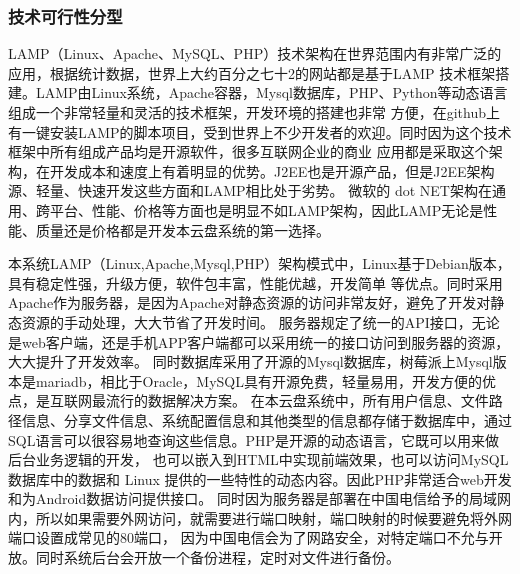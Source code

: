\subsubsection{技术可行性分型}
LAMP（Linux、Apache、MySQL、PHP）技术架构在世界范围内有非常广泛的应用，根据统计数据，世界上大约百分之七十2的网站都是基于LAMP
技术框架搭建。LAMP由Linux系统，Apache容器，Mysql数据库，PHP、Python等动态语言组成一个非常轻量和灵活的技术框架，开发环境的搭建也非常
方便，在github上有一键安装LAMP的脚本项目，受到世界上不少开发者的欢迎\cite{r27}。同时因为这个技术框架中所有组成产品均是开源软件，很多互联网企业的商业
应用都是采取这个架构，在开发成本和速度上有着明显的优势。J2EE也是开源产品，但是J2EE架构源、轻量、快速开发这些方面和LAMP相比处于劣势。
微软的 dot NET架构在通用、跨平台、性能、价格等方面也是明显不如LAMP架构，因此LAMP无论是性能、质量还是价格都是开发本云盘系统的第一选择\cite{r28,r29}。

本系统LAMP（Linux,Apache,Mysql,PHP）架构模式中，Linux基于Debian版本，具有稳定性强，升级方便，软件包丰富，性能优越，开发简单
等优点。同时采用Apache作为服务器，是因为Apache对静态资源的访问非常友好，避免了开发对静态资源的手动处理，大大节省了开发时间。
服务器规定了统一的API接口，无论是web客户端，还是手机APP客户端都可以采用统一的接口访问到服务器的资源，大大提升了开发效率。
同时数据库采用了开源的Mysql数据库，树莓派上Mysql版本是mariadb，相比于Oracle，MySQL具有开源免费，轻量易用，开发方便的优点，是互联网最流行的数据解决方案。
在本云盘系统中，所有用户信息、文件路径信息、分享文件信息、系统配置信息和其他类型的信息都存储于数据库中，通过SQL语言可以很容易地查询这些信息。PHP是开源的动态语言，它既可以用来做后台业务逻辑的开发，
也可以嵌入到HTML中实现前端效果，也可以访问MySQL数据库中的数据和 Linux 提供的一些特性的动态内容。因此PHP非常适合web开发和为Android数据访问提供接口。
同时因为服务器是部署在中国电信给予的局域网内，所以如果需要外网访问，就需要进行端口映射，端口映射的时候要避免将外网端口设置成常见的80端口，
因为中国电信会为了网路安全，对特定端口不允与开放。同时系统后台会开放一个备份进程，定时对文件进行备份。
\newpage
